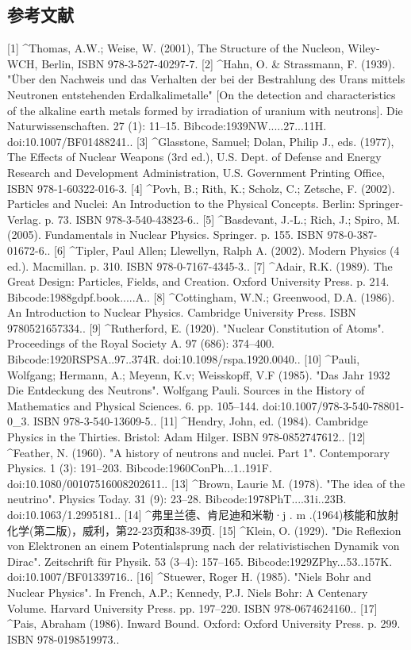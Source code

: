 \subsection{参考文献}
[1]
^Thomas, A.W.; Weise, W. (2001), The Structure of the Nucleon, Wiley-WCH, Berlin, ISBN 978-3-527-40297-7.
[2]
^Hahn, O. & Strassmann, F. (1939). "Über den Nachweis und das Verhalten der bei der Bestrahlung des Urans mittels Neutronen entstehenden Erdalkalimetalle" [On the detection and characteristics of the alkaline earth metals formed by irradiation of uranium with neutrons]. Die Naturwissenschaften. 27 (1): 11–15. Bibcode:1939NW.....27...11H. doi:10.1007/BF01488241..
[3]
^Glasstone, Samuel; Dolan, Philip J., eds. (1977), The Effects of Nuclear Weapons (3rd ed.), U.S. Dept. of Defense and Energy Research and Development Administration, U.S. Government Printing Office, ISBN 978-1-60322-016-3.
[4]
^Povh, B.; Rith, K.; Scholz, C.; Zetsche, F. (2002). Particles and Nuclei: An Introduction to the Physical Concepts. Berlin: Springer-Verlag. p. 73. ISBN 978-3-540-43823-6..
[5]
^Basdevant, J.-L.; Rich, J.; Spiro, M. (2005). Fundamentals in Nuclear Physics. Springer. p. 155. ISBN 978-0-387-01672-6..
[6]
^Tipler, Paul Allen; Llewellyn, Ralph A. (2002). Modern Physics (4 ed.). Macmillan. p. 310. ISBN 978-0-7167-4345-3..
[7]
^Adair, R.K. (1989). The Great Design: Particles, Fields, and Creation. Oxford University Press. p. 214. Bibcode:1988gdpf.book.....A..
[8]
^Cottingham, W.N.; Greenwood, D.A. (1986). An Introduction to Nuclear Physics. Cambridge University Press. ISBN 9780521657334..
[9]
^Rutherford, E. (1920). "Nuclear Constitution of Atoms". Proceedings of the Royal Society A. 97 (686): 374–400. Bibcode:1920RSPSA..97..374R. doi:10.1098/rspa.1920.0040..
[10]
^Pauli, Wolfgang; Hermann, A.; Meyenn, K.v; Weisskopff, V.F (1985). "Das Jahr 1932 Die Entdeckung des Neutrons". Wolfgang Pauli. Sources in the History of Mathematics and Physical Sciences. 6. pp. 105–144. doi:10.1007/978-3-540-78801-0_3. ISBN 978-3-540-13609-5..
[11]
^Hendry, John, ed. (1984). Cambridge Physics in the Thirties. Bristol: Adam Hilger. ISBN 978-0852747612..
[12]
^Feather, N. (1960). "A history of neutrons and nuclei. Part 1". Contemporary Physics. 1 (3): 191–203. Bibcode:1960ConPh...1..191F. doi:10.1080/00107516008202611..
[13]
^Brown, Laurie M. (1978). "The idea of the neutrino". Physics Today. 31 (9): 23–28. Bibcode:1978PhT....31i..23B. doi:10.1063/1.2995181..
[14]
^弗里兰德、肯尼迪和米勒·j . m .(1964)核能和放射化学(第二版)，威利，第22-23页和38-39页.
[15]
^Klein, O. (1929). "Die Reflexion von Elektronen an einem Potentialsprung nach der relativistischen Dynamik von Dirac". Zeitschrift für Physik. 53 (3–4): 157–165. Bibcode:1929ZPhy...53..157K. doi:10.1007/BF01339716..
[16]
^Stuewer, Roger H. (1985). "Niels Bohr and Nuclear Physics". In French, A.P.; Kennedy, P.J. Niels Bohr: A Centenary Volume. Harvard University Press. pp. 197–220. ISBN 978-0674624160..
[17]
^Pais, Abraham (1986). Inward Bound. Oxford: Oxford University Press. p. 299. ISBN 978-0198519973..
